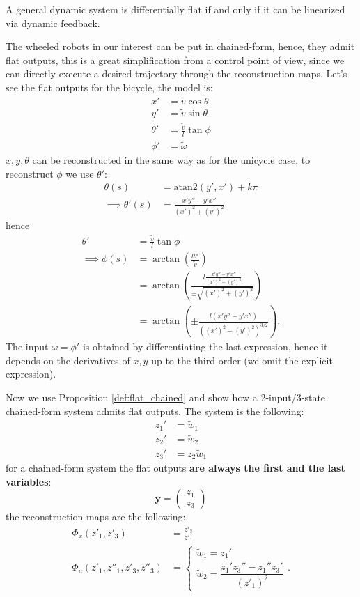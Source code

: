 \documentclass[10pt, a4paper]{report}
\newcommand{\y}{{\mathbf y}}
\begin{document}
\begin{boxproposition}{}{}
    A general dynamic system is differentially flat if and only if it can be linearized via dynamic feedback.
\end{boxproposition}
The wheeled robots in our interest can be put in chained-form, hence, they admit flat outputs, this is a great simplification from a control point of view, since we can directly execute a desired trajectory through the reconstruction maps. Let's see the flat outputs for the bicycle, the model is:\begin{align}
    x'&=\tilde v\cos\theta\\
y'&=\tilde v\sin\theta\\
\theta'&=\frac{\tilde v}{l}\tan\phi\\
\phi'&=\tilde\omega
\end{align}
$x,y,\theta$ can be reconstructed in the same way as for the unicycle case, to reconstruct $\phi$ we use $\theta'$:\begin{align}
    \theta(s)&=\text{atan2}(y',x')+k\pi\\ 
    \implies \theta'(s)&= \frac{x' y'' - y' x''}{(x')^2 + (y')^2}
\end{align}
hence\begin{align}
    \theta'&=\frac{\tilde v}{l}\tan\phi\\
    \implies\phi(s)&=\arctan\left(\frac{l\theta'}{\tilde v}\right)\\[1.5ex]
    &=\arctan\left(\frac{l\frac{x' y'' - y' x''}{(x')^2 + (y')^2}}{\pm\sqrt{(x')^2+(y')^2}}\right)\\ &=
    \arctan\left(\pm \frac{l(x' y'' - y' x'')}{\left((x')^2 + (y')^2\right)^{3/2}}\right).
\end{align}
The input $\tilde\omega=\phi'$ is obtained by differentiating the last expression, hence it depends on the derivatives of $x,y$ up to the third order (we omit the explicit expression).\bigskip

Now we use Proposition \ref{def:flat_chained} and show how a 2-input/3-state chained-form system admits flat outputs. The system is the following:\begin{align}
    z_1'&=\tilde w_1\\ 
    z_2'&=\tilde w_2\\ 
    z_3'&=z_2\tilde w_1
\end{align}
for a chained-form system the flat outputs \textbf{are always the first and the last variables}:\begin{equation}
    \y=\begin{pmatrix}
        z_1\\ z_3
    \end{pmatrix}
\end{equation}
the reconstruction maps are the following:\begin{align}
    \Phi_x(z'_1,z'_3)&=\frac{z'_3}{z'_1}\\
    \Phi_u(z'_1,z''_1,z'_3,z''_3)&=\begin{cases}
        \tilde w_1=z_1'\\[1.5ex]
        \tilde w_2=\dfrac{z_1'z_3''-z_1''z_3'}{(z'_1)^2}
    \end{cases}.
\end{align}
\end{document}
